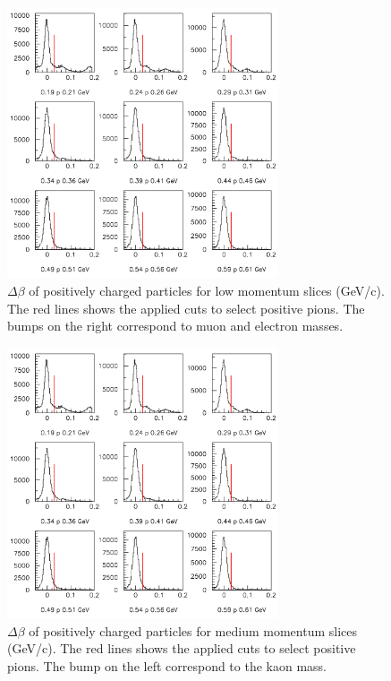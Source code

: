 \documentclass[12pt]{article}
\begin{document}
\begin{figure}[tbp]
\centering
\includegraphics[width=8cm] {answer-fig/TofProfile1.png} 
\caption {$\Delta \beta$ of positively charged particles for low momentum slices 
(GeV/c). The red lines shows the applied cuts to select positive pions. The bumps on the right
correspond to muon and electron masses.}
\label{TOF-1}
\end{figure}

\begin{figure}[tbp]
\centering
\includegraphics[width=8cm] {answer-fig/TofProfile1.png} 
\caption {$\Delta \beta$ of positively charged particles for medium momentum slices 
(GeV/c). The red lines shows the applied cuts to select positive pions. The bump on the left
correspond to the kaon mass.}
\label{TOF-2}
\end{figure}
\end{document}
